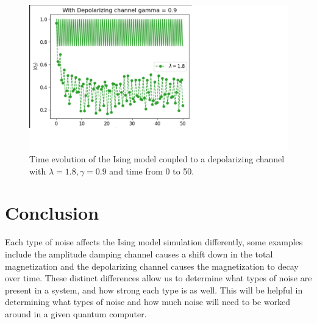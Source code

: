\documentclass[12pt, twocolumn]{article}
\begin{document}
  \begin{figure}
    \centering
    \includegraphics[width=\linewidth]{images/LongRun.png}
    \caption{Time evolution of the Ising model coupled to a depolarizing channel with \( \lambda = 1.8, \gamma = 0.9\) and time from 0 to 50.%
      \label{fig:LongRun}}
  \end{figure}

  \section{Conclusion}
  Each type of noise affects the Ising model simulation differently, some examples include the amplitude damping channel causes a shift down in the total magnetization and the depolarizing channel causes the magnetization to decay over time. These distinct differences allow us to determine what types of noise are present in a system, and how strong each type is as well. This will be helpful in determining what types of noise and how much noise will need to be worked around in a given quantum computer.

  \printbibliography
\end{document}
